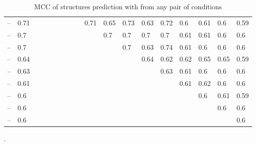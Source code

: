 \documentclass[11pt]{article} %
\begin{document}
\begin{table}[H]
\begin{adjustbox}{max width=\textwidth,max totalheight=\textheight,keepaspectratio}
\begin{tabular}{lHHHHHHHHHHHHHHHHH}
	 -- \BzCNMg            & 0.71                     &        &        &        &        &        &        &        & 0.71   & 0.65   & 0.73    & 0.63    & 0.72    & 0.6     & 0.61    & 0.6     & 0.59    \\
	 -- \OneMSevMgCE       & 0.7                      &        &        &        &        &        &        &        &        & 0.7    & 0.7     & 0.7     & 0.7     & 0.61    & 0.61    & 0.6     & 0.6     \\
	 -- \CMCTMg           & 0.7                      &        &        &        &        &        &        &        &        &        & 0.7     & 0.63    & 0.74    & 0.61    & 0.6     & 0.6     & 0.6     \\
	 -- \OneMSevILUThree  & 0.64                     &        &        &        &        &        &        &        &        &        &         & 0.64    & 0.62    & 0.62    & 0.65    & 0.65    & 0.59    \\
	 -- \DMSMg            & 0.63                     &        &        &        &        &        &        &        &        &        &         &         & 0.63    & 0.61    & 0.6     & 0.6     & 0.6     \\
	 -- \NMIACE           & 0.61                     &        &        &        &        &        &        &        &        &        &         &         &         & 0.61    & 0.62    & 0.6     & 0.6     \\
	 -- \OneMSevCE        & 0.6                      &        &        &        &        &        &        &        &        &        &         &         &         &         & 0.6     & 0.61    & 0.59    \\
	 -- \BzCN             & 0.6                      &        &        &        &        &        &        &        &        &        &         &         &         &         &         & 0.6     & 0.6     \\
	 -- \NAICE            & 0.6                      &        &        &        &        &        &        &        &        &        &         &         &         &         &         &         & 0.6     \\ \bottomrule
\end{tabular}
\end{adjustbox}
\caption{MCC of structures prediction with \OurTool{} from any pair of conditions}.
\end{table}
\end{document}
